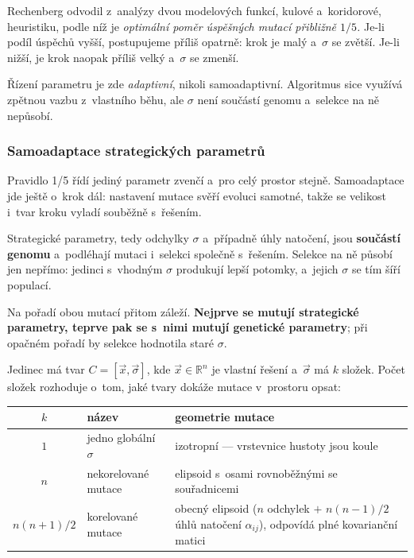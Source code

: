 \documentclass[11pt,a4paper]{article}
\theoremstyle{definition}
\begin{document}
\begin{defbox}
Rechenberg odvodil z~analýzy dvou modelových funkcí, kulové a~koridorové, heuristiku, podle
níž je \emph{optimální poměr úspěšných mutací přibližně $1/5$.} Je-li podíl úspěchů vyšší,
postupujeme příliš opatrně: krok je malý a~$\sigma$ se zvětší. Je-li nižší, je krok naopak
příliš velký a~$\sigma$ se zmenší.

Řízení parametru je zde \emph{adaptivní}, nikoli samoadaptivní. Algoritmus sice využívá
zpětnou vazbu z~vlastního běhu, ale $\sigma$ není součástí genomu a~selekce na ně nepůsobí.
\end{defbox}

\subsubsection{Samoadaptace strategických parametrů}

Pravidlo 1/5 řídí jediný parametr zvenčí a~pro celý prostor stejně. Samoadaptace jde ještě o~krok
dál: nastavení mutace svěří evoluci samotné, takže se velikost i~tvar kroku vyladí souběžně
s~řešením.

\begin{defbox}
Strategické parametry, tedy odchylky $\sigma$ a~případně úhly natočení, jsou
\textbf{součástí genomu} a~podléhají mutaci i~selekci společně s~řešením. Selekce na ně
působí jen nepřímo: jedinci s~vhodným $\sigma$ produkují lepší potomky, a~jejich $\sigma$
se tím šíří populací.

Na pořadí obou mutací přitom záleží. \textbf{Nejprve se mutují strategické parametry, teprve
pak se s~nimi mutují genetické parametry}; při opačném pořadí by selekce hodnotila staré
$\sigma$.
\end{defbox}

Jedinec má tvar $C = [\vec x, \vec \sigma]$, kde $\vec x \in \mathbb{R}^n$ je vlastní řešení
a~$\vec\sigma$ má $k$ složek. Počet složek rozhoduje o~tom, jaké tvary dokáže mutace
v~prostoru opsat:

\begin{center}
\begin{tabular}{@{}clp{8.2cm}@{}}
\toprule
$k$ & název & geometrie mutace \\
\midrule
$1$ & jedno globální $\sigma$ & izotropní --- vrstevnice hustoty jsou koule \\
$n$ & nekorelované mutace & elipsoid s~osami rovnoběžnými se souřadnicemi \\
$n(n+1)/2$ & korelované mutace & obecný elipsoid ($n$ odchylek $+$ $n(n-1)/2$
  úhlů natočení $\alpha_{ij}$), odpovídá plné kovarianční matici \\
\bottomrule
\end{tabular}
\end{center}
\end{document}
